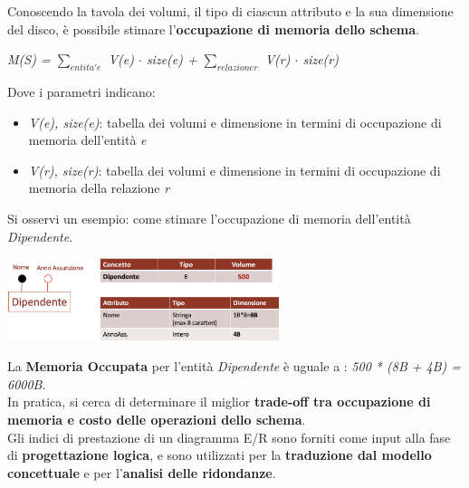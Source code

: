 \documentclass{article}
\begin{document}
Conoscendo la tavola dei volumi, il tipo di ciascun attributo e la sua dimensione del disco, è possibile stimare l'\textbf{occupazione di memoria dello schema}.\\
\begin{center}
    \textit{M(S) = $\sum_{entita' e}$ V(e) $\cdot$ size(e) + $\sum_{relazione r}$ V(r) $\cdot$ size(r)}\vspace{14pt}\\
\end{center}
Dove i parametri indicano:
\begin{itemize}[label={ }, leftmargin=1cm]
    \item \textit{V(e), size(e)}: tabella dei volumi e dimensione in termini di occupazione di memoria dell'entità \textit{e}
    \item \textit{V(r), size(r)}: tabella dei volumi e dimensione in termini di occupazione di memoria della relazione \textit{r}\vspace{30pt}\\
\end{itemize}
Si osservi un esempio: come stimare l'occupazione di memoria dell'entità \textit{Dipendente}.
\begin{center}
    \includegraphics[width=0.6\textwidth]{foto 15.png}
\end{center}
La \textbf{Memoria Occupata} per l'entità \textit{Dipendente} è uguale a : \textit{500 * (8B + 4B) = 6000B}.\vspace{14pt}\\
In pratica, si cerca di determinare il miglior \textbf{trade-off tra occupazione di memoria e costo delle operazioni dello schema}.\\
Gli indici di prestazione di un diagramma E/R sono forniti come input alla fase di \textbf{progettazione logica}, e sono utilizzati per la \textbf{traduzione dal modello concettuale} e per l'\textbf{analisi delle ridondanze}.
\end{document}
